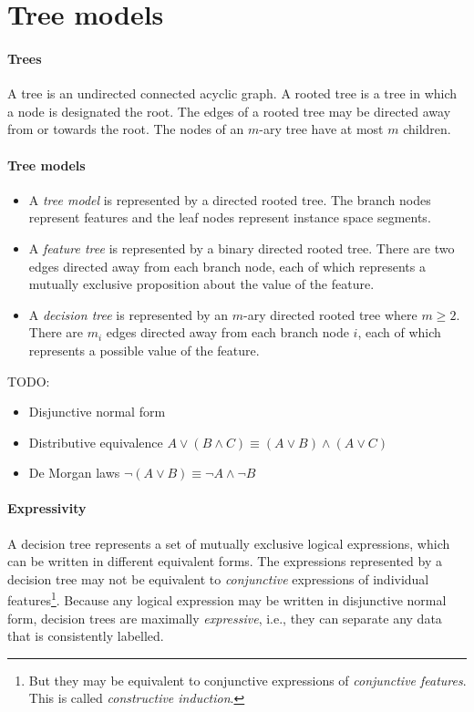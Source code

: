 \section{Tree models}

\paragraph{Trees}

A tree is an undirected connected acyclic graph.
A rooted tree is a tree in which a node is designated the root.
The edges of a rooted tree may be directed away from or towards the root.
The nodes of an $m$-ary tree have at most $m$ children.

\paragraph{Tree models}

\begin{itemize}
  \item A \textit{tree model} is represented by a directed rooted tree.
        The branch nodes represent features and the leaf nodes represent instance space segments.
  \item A \textit{feature tree} is represented by a binary directed rooted tree.
        There are two edges directed away from each branch node, each of which represents a mutually exclusive proposition about the value of the feature.
  \item A \textit{decision tree} is represented by an $m$-ary directed rooted tree where $m \geq 2$.
        There are $m_i$ edges directed away from each branch node $i$, each of which represents a possible value of the feature.
\end{itemize}

TODO:

\begin{itemize}
  \item Disjunctive normal form
  \item Distributive equivalence $A \vee (B \wedge C) \equiv (A \vee B) \wedge (A \vee C)$
  \item De Morgan laws $\neg (A \vee B) \equiv \neg A \wedge \neg B$
\end{itemize}

\paragraph{Expressivity}

A decision tree represents a set of mutually exclusive logical expressions, which can be written in different equivalent forms.
The expressions represented by a decision tree may not be equivalent to \textit{conjunctive} expressions of individual features\footnote{But they may be equivalent to conjunctive expressions of \textit{conjunctive features}. This is called \textit{constructive induction}.}.
Because any logical expression may be written in disjunctive normal form, decision trees are maximally \textit{expressive}, i.e., they can separate any data that is consistently labelled.

